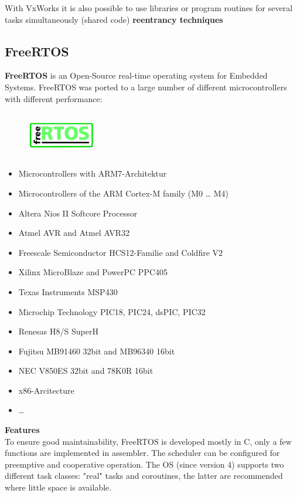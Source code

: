 With VxWorks it is also possible to use libraries or program routines for several tasks simultaneously (shared code)  \textbf{reentrancy techniques}

\subsection{ FreeRTOS}

\textbf{FreeRTOS} is an Open-Source  real-time operating system for Embedded Systems. FreeRTOS was ported to a large number  of different microcontrollers with different performance:

 	\begin{figure}[h]
    \centering
    \includegraphics[width=3cm, height=2cm]{Images/image129.png}
    \label{fig:Fig 80}
    \end{figure}
    
\begin{itemize}
\item  Microcontrollers with ARM7-Architektur
\item  Microcontrollers of the ARM Cortex-M family (M0 {\dots} M4)
\item  Altera Nios II Softcore Processor
\item  Atmel AVR and Atmel AVR32
\item  Freescale Semiconductor HCS12-Familie and Coldfire V2
\item  Xilinx MicroBlaze and PowerPC PPC405
\item  Texas Instruments MSP430
\item  Microchip Technology PIC18, PIC24, dsPIC, PIC32
\item  Renesas H8/S SuperH
\item  Fujitsu MB91460 32bit and MB96340 16bit
\item  NEC V850ES 32bit and 78K0R 16bit
\item  x86-Arcitecture
\item  {\dots}
\end{itemize}

\textbf{Features}\\

To ensure good maintainability, FreeRTOS is developed mostly in C, only a few functions are implemented in assembler. The scheduler can be configured for preemptive and cooperative operation. The OS (since version 4) supports two different task classes: "real" tasks and coroutines, the latter are recommended where little space is available.\\

